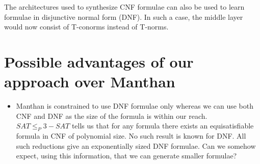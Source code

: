 The architectures used to synthesize CNF formulae can also be used to learn formulae in disjunctive normal form (DNF).  In such a case, the middle layer would now consist of T-conorms instead of T-norms.

\section{Possible advantages of our approach over Manthan}
\begin{itemize}
\item Manthan is constrained to use DNF formulae only whereas we can use both CNF and DNF as the size of the formula is within our reach.  $SAT \leq_P 3-SAT$ tells us that for any formula there exists an equisatisfiable formula in CNF of polynomial size.  No  such result is known for DNF.  All such reductions give an exponentially sized DNF formulae. Can we somehow expect, using this information, that we can generate smaller formulae?

\end{itemize}